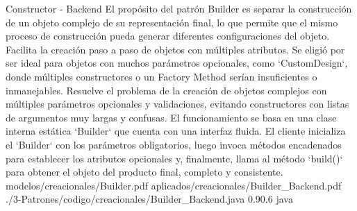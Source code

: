 \Patron
    {Constructor - Backend}
    {El propósito del patrón Builder es separar la construcción de un objeto complejo de su representación final, lo que permite que el mismo proceso de construcción pueda generar diferentes configuraciones del objeto. Facilita la creación paso a paso de objetos con múltiples atributos. Se eligió por ser ideal para objetos con muchos parámetros opcionales, como `CustomDesign`, donde múltiples constructores o un Factory Method serían insuficientes o inmanejables.}
    {Resuelve el problema de la creación de objetos complejos con múltiples parámetros opcionales y validaciones, evitando constructores con listas de argumentos muy largas y confusas. El funcionamiento se basa en una clase interna estática `Builder` que cuenta con una interfaz fluida. El cliente inicializa el `Builder` con los parámetros obligatorios, luego invoca métodos encadenados para establecer los atributos opcionales y, finalmente, llama al método `build()` para obtener el objeto del producto final, completo y consistente.}
    {modelos/creacionales/Builder.pdf}
    {aplicados/creacionales/Builder_Backend.pdf}
    {./3-Patrones/codigo/creacionales/Builder_Backend.java}
    {0.9}{0.6}
    {java}
\newpage

